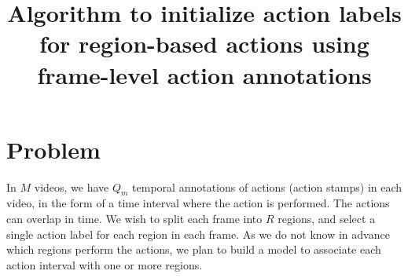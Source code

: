 \documentclass[11pt,letterpaper]{article}
\newcommand{\+}[1]{\ensuremath{{\boldsymbol #1}}}
\begin{document}
\title{Algorithm to initialize action labels for region-based actions using frame-level action annotations}


\maketitle

\section{Problem}

In $M$ videos, we have $Q_m$ temporal annotations of actions (action stamps) in each video, in the form of a time interval where the action is performed. The actions can overlap in time. We wish to split each frame into $R$ regions, and select a single action label for each region in each frame. As we do not know in advance which regions perform the actions, we plan to build a model to associate each action interval with one or more regions.
\end{document}
